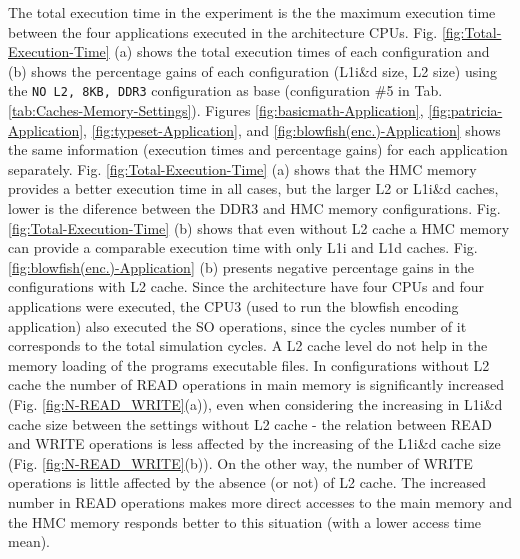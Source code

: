 \documentclass{sig-alternate-05-2015}
\begin{document}
The total execution time in the experiment is the the maximum execution
time between the four applications executed in the architecture CPUs.
Fig. \ref{fig:Total-Execution-Time} (a) shows the total execution
times of each configuration and (b) shows the percentage gains of
each configuration (L1i\&d size, L2 size) using the \texttt{NO L2,
8KB, DDR3} configuration as base (configuration \#5 in Tab. \ref{tab:Caches-Memory-Settings}).
Figures \ref{fig:basicmath-Application}, \ref{fig:patricia-Application},
\ref{fig:typeset-Application}, and \ref{fig:blowfish(enc.)-Application}
shows the same information (execution times and percentage gains)
for each application separately. Fig. \ref{fig:Total-Execution-Time}
(a) shows that the HMC memory provides a better execution time in
all cases, but the larger L2 or L1i\&d caches, lower is the diference
between the DDR3 and HMC memory configurations. Fig. \ref{fig:Total-Execution-Time}
(b) shows that even without L2 cache a HMC memory can provide a comparable
execution time with only L1i and L1d caches. Fig. \ref{fig:blowfish(enc.)-Application}
(b) presents negative percentage gains in the configurations with
L2 cache. Since the architecture have four CPUs and four applications
were executed, the CPU3 (used to run the blowfish encoding application)
also executed the SO operations, since the cycles number of it corresponds
to the total simulation cycles. A L2 cache level do not help in the
memory loading of the programs executable files. In configurations
without L2 cache the number of READ operations in main memory is significantly
increased (Fig. \ref{fig:N-READ_WRITE}(a)), even when considering
the increasing in L1i\&d cache size between the settings without L2
cache - the relation between READ and WRITE operations is less affected
by the increasing of the L1i\&d cache size (Fig. \ref{fig:N-READ_WRITE}(b)).
On the other way, the number of WRITE operations is little affected
by the absence (or not) of L2 cache. The increased number in READ
operations makes more direct accesses to the main memory and the HMC
memory responds better to this situation (with a lower access time
mean).
\end{document}
